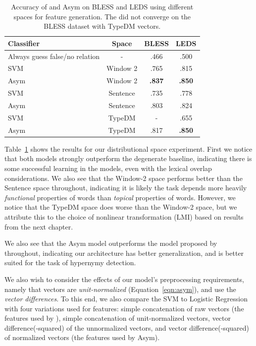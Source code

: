 \begin{table}
  \centering
  \begin{tabular}{|lc|cc|}
    \hline
    {\bf Classifier}                      &{\bf Space}& {\bf BLESS}  & {\bf LEDS} \\
    \hline
    \hline
    Always guess false/no relation        &   -       &      .466    &      .500  \\
    \hline
    SVM \cite{baroni:2012:eacl}           & Window 2  &      .765    &      .815  \\
    Asym \cite{roller:2014:coling}        & Window 2  & {\bf .837   }& {\bf .850} \\
    \hline
    SVM                                   & Sentence  &      .735    &      .778  \\
    Asym                                  & Sentence  &      .803    &      .824  \\
    \hline
    SVM                                   & TypeDM    &        -     &      .655  \\
    Asym                                  & TypeDM    &      .817    & {\bf .850} \\
    \hline
  \end{tabular}
  \caption{Accuracy of  and Asym on BLESS and LEDS
    using different spaces for feature generation. The
     did not converge on the BLESS dataset with
    TypeDM vectors.}
  \label{tab:asymspaces}
\end{table}

Table~\ref{tab:asymspaces} shows the results for our distributional space
experiment.  First we notice that both models strongly outperform the
degenerate baseline, indicating there is some successful learning in the
models, even with the lexical overlap considerations. We also see that the
Window-2 space performs better than the Sentence space throughout,
indicating it is likely the task depends more heavily {\em functional}
properties of words than {\em topical} properties of words. However, we notice
that the TypeDM space does worse than the Window-2 space, but we attribute this
to the choice of nonlinear transformation (LMI) based on results from the next
chapter.

We also see that the Asym model outperforms the model proposed by
 throughout, indicating our
architecture has better generalization, and is better suited for the task
of hypernymy detection.

We also wish to consider the effects of our model's preprocessing requirements,
namely that vectors are {\em unit-normalized} (Equation~\ref{eqn:asym}), and
use the {\em vector differences}. To this end, we also compare the SVM to
Logistic Regression with four variations used for features: simple
concatenation of raw vectors (the features used by ),
simple concatenation of unit-normalized vectors, vector difference(-squared) of
the unnormalized vectors, and vector difference(-squared) of normalized vectors
(the features used by Asym).

